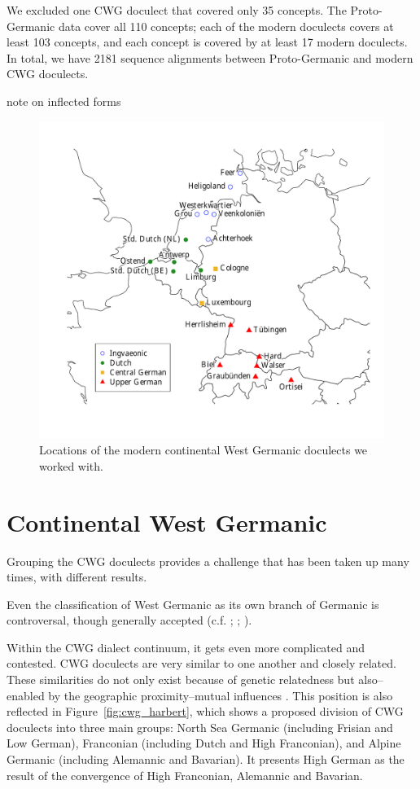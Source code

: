 \documentclass[a4paper]{article}
\begin{document}
We excluded one CWG doculect that covered only 35 concepts. %
The Proto-Germanic data cover all 110 concepts; each of the modern doculects covers at least 103 concepts, and each concept is covered by at least 17 modern doculects.
In total, we have 2181 sequence alignments between Proto-Germanic and modern CWG doculects.

note on inflected forms

\begin{figure}[h]
\centering
\includegraphics[width=\textwidth]{figures/map.pdf}
\caption{Locations of the modern continental West Germanic doculects we worked with.}
\label{fig:map}
\end{figure}


\section{Continental West Germanic}
\label{sec:cwg}

Grouping the CWG doculects provides a challenge
that has been taken up many times, with different results.

Even the classification of West Germanic
as its own branch of Germanic is controversal,
though generally accepted
(c.f. \citet{voyles1971problem}; \citet[pp. 7-8]{harbert2007germanic}; \citet{ringe2012cladistic}). %

Within the CWG dialect continuum, it gets even more complicated and contested.
CWG doculects are very similar to one another and closely related.
These similarities do not only exist because of genetic relatedness
but also--enabled by the geographic proximity--mutual influences
\citep[p. 8]{harbert2007germanic}.
This position is also reflected in Figure~\ref{fig:cwg_harbert},
which shows a proposed division of CWG doculects
into three main groups: North Sea Germanic (including Frisian and Low German),
Franconian (including Dutch and High Franconian),
and Alpine Germanic (including Alemannic and Bavarian).
It presents High German as the result of the convergence
of High Franconian, Alemannic and Bavarian.
\end{document}
